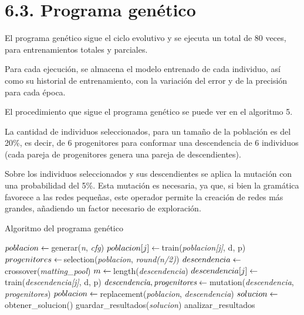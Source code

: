 \documentclass[spanish,a4paper,12pt,twoside]{report}
\begin{document}
  \section*{\Large 6.3. Programa genético}
  El programa genético sigue el ciclo evolutivo y se ejecuta un total de 80 veces, para entrenamientos totales y parciales. \par
  Para cada ejecución, se almacena el modelo entrenado de cada individuo, así como su historial de entrenamiento, con la variación del error y de la precisión para cada época. \par
  El procedimiento que sigue el programa genético se puede ver en el algoritmo 5. \par
  La cantidad de individuos seleccionados, para un tamaño de la población es del 20\%, es decir, de 6 progenitores para conformar una descendencia de 6 individuos (cada pareja de progenitores genera una pareja de descendientes). \par
  Sobre los individuos seleccionados y sus descendientes se aplica la mutación con una probabilidad del 5\%. Esta mutación es necesaria, ya que, si bien la gramática favorece a las redes pequeñas, este operador permite la creación de redes más grandes, añadiendo un factor necesario de exploración. \par
  \begin{algorithm}[H]
    \caption{Algoritmo del programa genético}\label{entren}
    \begin{algorithmic}[1]
       
          \State $poblacion \gets \thinspace $generar(\textit{n}, \textit{cfg})
            \State $poblacion[j] \gets \thinspace $train(\textit{poblacion[j]}, d, p)
          \EndFor
            \State $progenitores \gets \thinspace $selection(\textit{poblacion}, \textit{round(n/2)})
            \State $descendencia \gets \thinspace $crossover(\textit{matting\_pool})
            \State $m \gets \thinspace $length(\textit{descendencia})
              \State $descendencia[j] \gets \thinspace $train(\textit{descendencia[j]}, d, p)
            \EndFor
            \State $\textit{descendencia}, \textit{progenitores} \gets \thinspace $mutation(\textit{descendencia}, \textit{progenitores})
            \State $poblacion \gets \thinspace $replacement(\textit{poblacion}, \textit{descendencia})
          \EndWhile
          \State $solucion \gets \thinspace $obtener\_solucion()
          \State guardar\_resultados(\textit{solucion})
        \EndFor
        \State analizar\_resultados
      \EndFunction
    \end{algorithmic}
  \end{algorithm} \par
\end{document}
